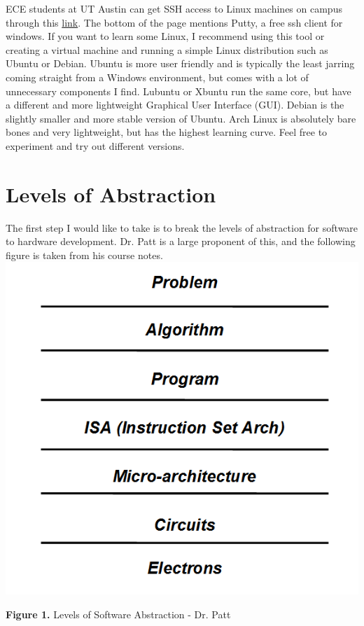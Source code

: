 \documentclass[paper=a4, fontsize=11pt]{scrartcl}
\numberwithin{equation}{section}		%
\numberwithin{figure}{section}			%
\numberwithin{table}{section}			%
\begin{document}
ECE students at UT Austin can get SSH access to Linux machines on campus through this \href{http://www.ece.utexas.edu/it/remote-Linux}{link}. The bottom of the page mentions Putty, a free ssh client for windows. If you want to learn some Linux, I recommend using this tool or creating a virtual machine and running a simple Linux distribution such as Ubuntu or Debian. Ubuntu is more user friendly and is typically the least jarring coming straight from a Windows environment, but comes with a lot of unnecessary components I find. Lubuntu or Xbuntu run the same core, but have a different and more lightweight Graphical User Interface (GUI). Debian is the slightly smaller and more stable version of Ubuntu. Arch Linux is absolutely bare bones and very lightweight, but has the highest learning curve. Feel free to experiment and try out different versions.

\section{Levels of Abstraction}
The first step I would like to take is to break the levels of abstraction for software to hardware development. Dr. Patt is a large proponent of this, and the following figure is taken from his course notes.
\vskip 0.1in
\includegraphics[width=\textwidth]{images/levels_of_abstraction}
\vskip 0.05in
\centerline{\textbf{Figure 1. }Levels of Software Abstraction - Dr. Patt}
\end{document}
